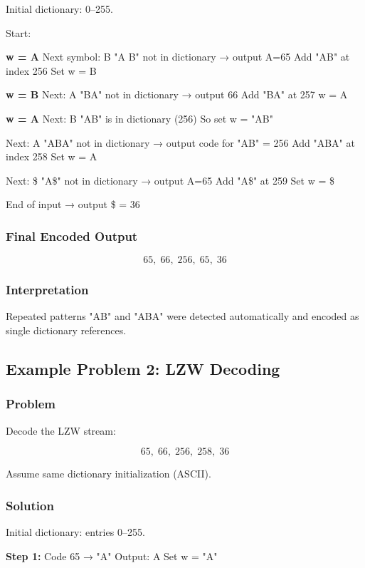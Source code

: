 \documentclass{AnantDocumentation}
\begin{document}
Initial dictionary: 0–255.

Start:

\textbf{w = A}  
Next symbol: B  
"A B" not in dictionary → output A=65  
Add "AB" at index 256  
Set w = B

\textbf{w = B}  
Next: A  
"BA" not in dictionary → output 66  
Add "BA" at 257  
w = A

\textbf{w = A}  
Next: B  
"AB" is in dictionary (256)  
So set w = "AB"

Next: A  
"ABA" not in dictionary → output code for "AB" = 256  
Add "ABA" at index 258  
Set w = A

Next: \$  
"A\$" not in dictionary → output A=65  
Add "A\$" at 259  
Set w = \$

End of input → output \$ = 36

\subsubsection*{Final Encoded Output}

\[
\boxed{65,\; 66,\; 256,\; 65,\; 36}
\]

\subsubsection*{Interpretation}

Repeated patterns "AB" and "ABA" were detected automatically and encoded as single dictionary references.

\subsection{Example Problem 2: LZW Decoding}

\subsubsection*{Problem}

Decode the LZW stream:

\[
65,\; 66,\; 256,\; 258,\; 36
\]

Assume same dictionary initialization (ASCII).

\subsubsection*{Solution}

Initial dictionary: entries 0–255.

\textbf{Step 1:}  
Code 65 → "A"  
Output: A  
Set w = "A"
\end{document}

